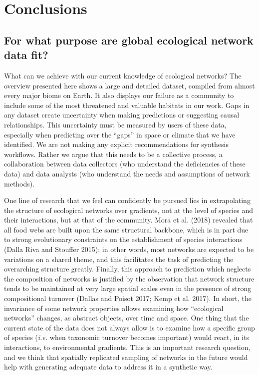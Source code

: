 \documentclass[10pt,oneside]{article}
\begin{document}
\hypertarget{conclusions}{%
\section{Conclusions}\label{conclusions}}

\hypertarget{for-what-purpose-are-global-ecological-network-data-fit}{%
\subsection{For what purpose are global ecological network data
fit?}\label{for-what-purpose-are-global-ecological-network-data-fit}}

What can we achieve with our current knowledge of ecological networks?
The overview presented here shows a large and detailed dataset, compiled
from almost every major biome on Earth. It also displays our failure as
a community to include some of the most threatened and valuable habitats
in our work. Gaps in any dataset create uncertainty when making
predictions or suggesting causal relationships. This uncertainty must be
measured by users of these data, especially when predicting over the
``gaps'' in space or climate that we have identified. We are not making
any explicit recommendations for synthesis workflows. Rather we argue
that this needs to be a collective process, a collaboration between data
collectors (who understand the deficiencies of these data) and data
analysts (who understand the needs and assumptions of network methods).

One line of research that we feel can confidently be pursued lies in
extrapolating the structure of ecological networks over gradients, not
at the level of species and their interactions, but at that of the
community. Mora et al. (2018) revealed that all food webs are built upon
the same structural backbone, which is in part due to strong
evolutionary constraints on the establishment of species interactions
(Dalla Riva and Stouffer 2015); in other words, most networks are
expected to be variations on a shared theme, and this facilitates the
task of predicting the overarching structure greatly. Finally, this
approach to prediction which neglects the composition of networks is
justified by the observation that network structure tends to be
maintained at very large spatial scales even in the presence of strong
compositional turnover (Dallas and Poisot 2017; Kemp et al. 2017). In
short, the invariance of some network properties allows examining how
``ecological networks'' changes, as abstract objects, over time and
space. One thing that the current state of the data does not always
allow is to examine how a specific group of species (\emph{i.e.} when
taxonomic turnover becomes important) would react, in its interactions,
to environmental gradients. This is an important research question, and
we think that spatially replicated sampling of networks in the future
would help with generating adequate data to address it in a synthetic
way.
\end{document}
